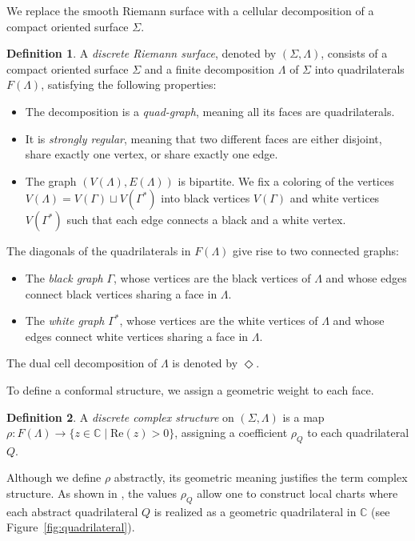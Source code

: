 \documentclass[11pt,a4paper]{article}
\theoremstyle{definition}
\newtheorem*{definition}{Definition}
\begin{document}
We replace the smooth Riemann surface with a cellular decomposition of a compact oriented surface $\Sigma$.

\begin{definition}
	A \textit{discrete Riemann surface}, denoted by $(\Sigma,\Lambda)$, consists of a compact oriented surface $\Sigma$ and a finite decomposition $\Lambda$ of $\Sigma$ into quadrilaterals $F(\Lambda)$, satisfying the following properties:
	\begin{itemize}
		\item The decomposition is a \textit{quad-graph}, meaning all its faces are quadrilaterals.
		\item It is \textit{strongly regular}, meaning that two different faces are either disjoint, share exactly one vertex, or share exactly one edge.
		\item The graph $(V(\Lambda),E(\Lambda))$ is bipartite. We fix a coloring of the vertices $V(\Lambda) = V(\Gamma) \sqcup V(\Gamma^*)$ into black vertices $V(\Gamma)$ and white vertices $V(\Gamma^*)$ such that each edge connects a black and a white vertex.
	\end{itemize}
\end{definition}

The diagonals of the quadrilaterals in $F(\Lambda)$ give rise to two connected graphs:
\begin{itemize}
	\item The \textit{black graph} $\Gamma$, whose vertices are the black vertices of $\Lambda$ and whose edges connect black vertices sharing a face in $\Lambda$.
	\item The \textit{white graph} $\Gamma^*$, whose vertices are the white vertices of $\Lambda$ and whose edges connect white vertices sharing a face in $\Lambda$.
\end{itemize}
The dual cell decomposition of $\Lambda$ is denoted by $\Diamond$.

To define a conformal structure, we assign a geometric weight to each face.

\begin{definition}
	A \textit{discrete complex structure} on $(\Sigma, \Lambda)$ is a map $\rho: F(\Lambda) \to \{z \in \mathds{C} \mid \mathrm{Re}(z) > 0\}$, assigning a coefficient $\rho_Q$ to each quadrilateral $Q$.
\end{definition}

Although we define $\rho$ abstractly, its geometric meaning justifies the term complex structure. As shown in \cite{BoG17}, the values $\rho_Q$ allow one to construct local charts where each abstract quadrilateral $Q$ is realized as a geometric quadrilateral in $\mathds{C}$ (see Figure~\ref{fig:quadrilateral}).
\end{document}
